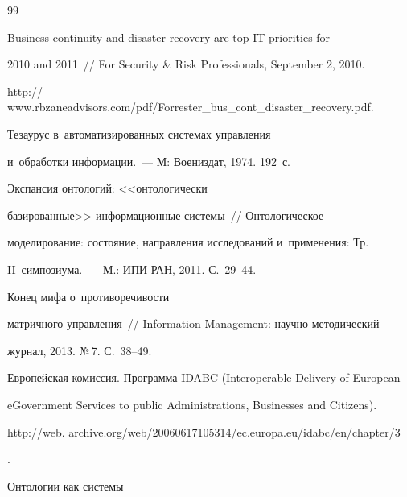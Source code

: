 {\small\frenchspacing


{%




\begin{thebibliography}{99}




 Business continuity and disaster recovery are top IT priorities for


2010 and 2011~/\!\!/ For Security \& Risk Professionals, September 2, 2010.


  {\sf http:// www.rbzaneadvisors.com/pdf/Forrester\_bus\_cont\_disaster\_recovery.pdf}.







 Тезаурус в~автоматизированных системах управления


и~обработки информации.~--- М: Воениздат, 1974. 192~с.







 Экспансия онтологий: <<онтологически


базированные>> информационные системы~/\!\!/ Онтологическое


моделирование: состояние, направления исследований и~применения: Тр.


II~симпозиума.~--- М.: ИПИ РАН, 2011. С.~29--44.







 Конец мифа о~противоречивости


матричного управления~/\!\!/ Information Management: научно-методический


журнал, 2013. №\,7. С.~38--49.




Европейская комиссия. Программа IDABC (Interoperable Delivery of European


eGovernment Services to public Administrations, Businesses and Citizens). {\sf


http://web. archive.org/web/20060617105314/ec.europa.eu/idabc/en/chapter/3}.




 Онтологии как системы



\end{thebibliography}}}

